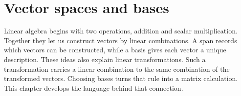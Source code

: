 \chapter{Vector spaces and bases}
\label{ch:linear-algebra-i:vector-spaces-and-bases}

Linear algebra begins with two operations, addition and scalar multiplication.
Together they let us construct vectors by linear combinations. A span records
which vectors can be constructed, while a basis gives each vector a unique
description. These ideas also explain linear transformations. Such a
transformation carries a linear combination to the same combination of the
transformed vectors. Choosing bases turns that rule into a matrix calculation.
This chapter develops the language behind that connection.



